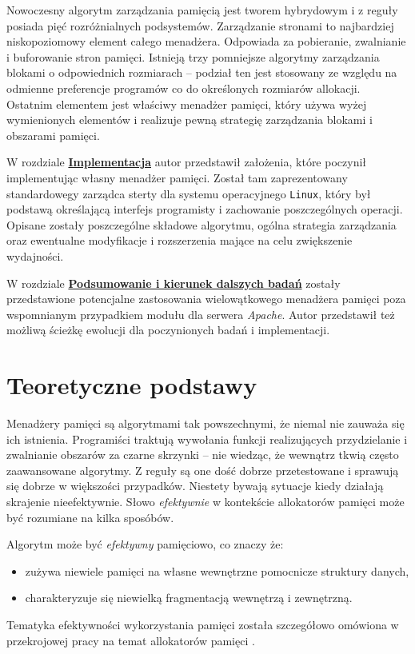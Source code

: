 \documentclass[12pt,a4paper,titlepage,twoside]{mwart}
\begin{document}
Nowoczesny algorytm zarządzania pamięcią jest tworem hybrydowym i z reguły
posiada pięć rozróżnialnych podsystemów. Zarządzanie stronami to najbardziej
niskopoziomowy element całego menadżera. Odpowiada za pobieranie, zwalnianie i
buforowanie stron pamięci. Istnieją trzy pomniejsze algorytmy zarządzania
blokami o odpowiednich rozmiarach -- podział ten jest stosowany ze względu na
odmienne preferencje programów co do określonych rozmiarów allokacji. Ostatnim
elementem jest właściwy menadżer pamięci, który używa wyżej wymienionych
elementów i realizuje pewną strategię zarządzania blokami i obszarami pamięci.

W rozdziale \hyperlink{Implementacja}{\textbf{Implementacja}} autor przedstawił
założenia, które poczynił implementując własny menadżer pamięci. Został tam
zaprezentowany standardowegy zarządca sterty dla systemu operacyjnego
\texttt{Linux}, który był podstawą określającą interfejs programisty i
zachowanie poszczególnych operacji. Opisane zostały poszczególne składowe
algorytmu, ogólna strategia zarządzania oraz ewentualne modyfikacje i
rozszerzenia mające na celu zwiększenie wydajności.

W rozdziale \hyperlink{Podsumowanie}{\textbf{Podsumowanie i kierunek dalszych
badań}} zostały przedstawione potencjalne zastosowania wielowątkowego menadżera
pamięci poza wspomnianym przypadkiem modułu dla serwera \textit{Apache}. Autor
przedstawił też możliwą ścieżkę ewolucji dla poczynionych badań i
implementacji.

\newpage


\section{Teoretyczne podstawy}
\hypertarget{Teoria}{}

Menadżery pamięci są algorytmami tak powszechnymi, że niemal nie zauważa się ich
istnienia. Programiści traktują wywołania funkcji realizujących przydzielanie i
zwalnianie obszarów za czarne skrzynki -- nie wiedząc, że wewnątrz tkwią często
zaawansowane algorytmy. Z reguły są one dość dobrze przetestowane i sprawują
się dobrze w większości przypadków. Niestety bywają sytuacje kiedy działają
skrajenie nieefektywnie.  Słowo \textit{efektywnie} w kontekście allokatorów
pamięci może być rozumiane na kilka sposóbów.

Algorytm może być \textit{efektywny} pamięciowo, co znaczy że:
\begin{itemize}
\item zużywa niewiele pamięci na własne wewnętrzne pomocnicze struktury danych,
\item charakteryzuje się niewielką fragmentacją wewnętrzą i zewnętrzną.
\end{itemize}
Tematyka efektywności wykorzystania pamięci została szczegółowo omówiona w
przekrojowej pracy na temat allokatorów pamięci \cite{paul95dynamic}.
\end{document}
